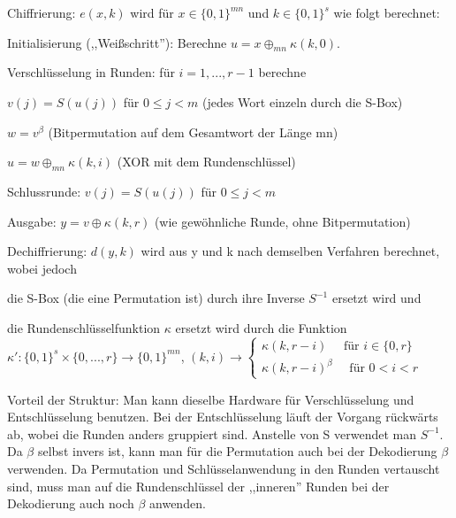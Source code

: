 \documentclass[a4paper]{article}
\begin{document}
\begin{multicols}{3}
    Chiffrierung: $e(x,k)$ wird für $x\in\{0,1\}^{mn}$ und $k\in\{0,1\}^s$ wie folgt berechnet:
    \begin{enumerate*}
        \item Initialisierung (,,Weißschritt''): Berechne $u=x\oplus_{mn} \kappa (k,0)$.
        \item Verschlüsselung in Runden: für $i=1,...,r-1$ berechne
        \begin{enumerate*}
            \item $v(j)=S(u(j))$ für $0\leq j<m$ (jedes Wort einzeln durch die S-Box)
            \item  $w=v^{\beta}$ (Bitpermutation auf dem Gesamtwort der Länge mn)
            \item  $u=w\oplus_{mn} \kappa (k,i)$ (XOR mit dem Rundenschlüssel)
            \item Schlussrunde: $v(j)=S(u(j))$ für $0\leq j<m$
            \item  Ausgabe: $y=v\oplus \kappa (k,r)$ (wie gewöhnliche Runde, ohne Bitpermutation)
        \end{enumerate*}
    \end{enumerate*}

    Dechiffrierung: $d(y,k)$ wird aus y und k nach demselben Verfahren berechnet, wobei jedoch
    \begin{enumerate*}
        \item die S-Box (die eine Permutation ist) durch ihre Inverse $S^{-1}$ ersetzt wird und
        \item  die Rundenschlüsselfunktion $\kappa$ ersetzt wird durch die Funktion $\kappa':\{0,1\}^s\times\{0,...,r\}\rightarrow\{0,1\}^{mn}$, $(k,i)\rightarrow\begin{cases} \kappa (k,r-i)\quad\text{ für } i\in\{0,r\}\\ \kappa(k,r-i)^{\beta} \quad\text{ für } 0<i<r \end{cases}$
    \end{enumerate*}

    Vorteil der Struktur: Man kann dieselbe Hardware für Verschlüsselung und Entschlüsselung benutzen. Bei der Entschlüsselung läuft der Vorgang rückwärts ab, wobei die Runden anders gruppiert sind. Anstelle von S verwendet man $S^{-1}$. Da $\beta$ selbst invers ist, kann man für die Permutation auch bei der Dekodierung $\beta$ verwenden. Da Permutation und Schlüsselanwendung in den Runden vertauscht sind, muss man auf die Rundenschlüssel der ,,inneren'' Runden bei der Dekodierung auch noch $\beta$ anwenden.


\end{multicols}
\end{document}
